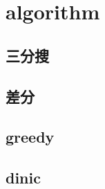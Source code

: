 \section{algorithm}
    \subsection{三分搜}
        
    \subsection{差分}
        
    \subsection{greedy}
        
    \subsection{dinic}
        
